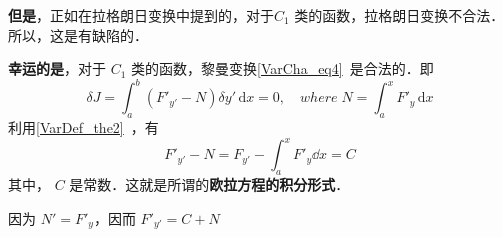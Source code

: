\textbf{但是}，正如在拉格朗日变换中提到的，对于$C_1$ 类的函数，拉格朗日变换不合法．所以，这是有缺陷的．

\textbf{幸运的是}，对于 $C_1$ 类的函数，黎曼变换\autoref{VarCha_eq4}~是合法的．即
\begin{equation}
\delta J=\int_a^b \left(F'_{y'}-N \right) \delta y' \,\mathrm{d}{x}=0  ,\quad where \;N=\int_a^xF'_y \,\mathrm{d}{x} 
\end{equation}
利用\autoref{VarDef_the2}~，有
\begin{equation}
F'_{y'}-N=F_{y'}-\int_a^xF'_y\dd x=C
\end{equation}
其中， $C$ 是常数．这就是所谓的\textbf{欧拉方程的积分形式}．

因为 $N'=F'_y$，因而 $F'_{y'}=C+N$